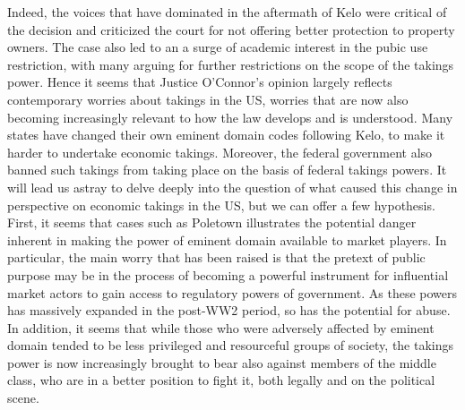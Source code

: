 {Indeed, the voices that have dominated in the aftermath of Kelo were critical of the decision and criticized the court for not offering better protection to property owners. The case also led to an a surge of academic interest in the pubic use restriction, with many arguing for further restrictions on the scope of the takings power. 
Hence it seems that Justice O'Connor's opinion largely reflects contemporary worries about takings in the US, worries that are now also becoming increasingly relevant to how the law develops and is understood. Many states have changed their own eminent domain codes  following Kelo, to make it harder to undertake economic takings. Moreover, the federal government also banned such takings from taking place on the basis of federal takings powers.
It will lead us astray to delve deeply into the question of what caused this change in perspective on economic takings in the US, but we can offer a few hypothesis. First, it seems that cases such as Poletown illustrates the potential danger inherent in making the power of eminent domain available to market players. In particular, the main worry that has been raised is that the pretext of public purpose may be in the process of becoming a powerful instrument for influential market actors to gain access to regulatory powers of government. As these powers has massively expanded in the post-WW2 period, so has the potential for abuse. In addition, it seems that while those who were adversely affected by eminent domain tended to be less privileged and resourceful groups of society, the takings power is now increasingly brought to bear also against members of the middle class, who are in a better position to fight it, both legally and on the political scene.

}
